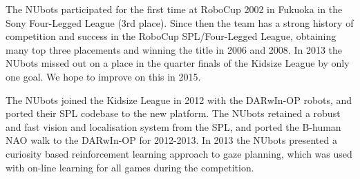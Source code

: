 \documentclass{llncs}
\begin{document}
The NUbots participated for the first time at RoboCup 2002 in Fukuoka in the Sony Four-Legged League (3rd place). Since then the team has  a strong history of competition and success in the RoboCup SPL/Four-Legged League, obtaining many top three placements and winning the title in 2006 and 2008. In 2013 the NUbots missed out on a place in the quarter finals of the Kidsize League by only one goal. We hope to improve on this in 2015.

The NUbots joined the Kidsize League in 2012 with the DARwIn-OP robots, and ported their SPL codebase to the new platform. The NUbots retained a robust and fast vision and localisation system from the SPL, and ported the B-human NAO walk to the DARwIn-OP for 2012-2013. In 2013 the NUbots presented a curiosity based reinforcement learning approach to gaze planning, which was used with on-line learning for all games during the competition.

\end{document}
